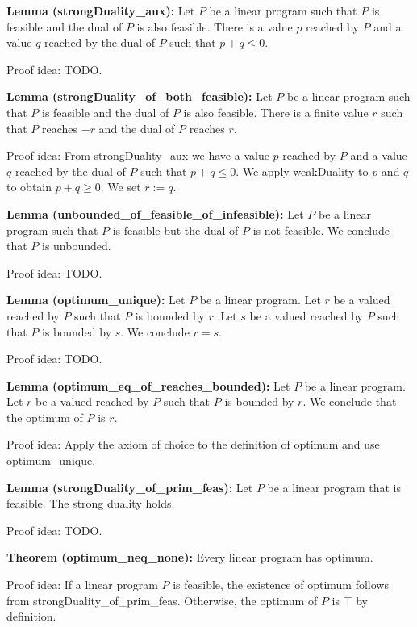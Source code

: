 \documentclass[]{article}
\renewcommand{\.}{\hskip .75pt}
\begin{document}
\medskip \noindent
\textbf{Lemma (strongDuality\_aux):}
Let $P$ be a linear program such that
$P$ is feasible and the dual of $P$ is also feasible.
There is a value $p$ reached by $P$ and
a value $q$ reached by the dual of $P$ such
that $p + q \le 0$.

\medskip \noindent
Proof idea:
TODO.

\medskip \noindent
\textbf{Lemma (strongDuality\_of\_both\_feasible):}
Let $P$ be a linear program such that
$P$ is feasible and the dual of $P$ is also feasible.
There is a finite value $r$ such that
$P$ reaches $-r$ and the dual of $P$ reaches $r$.

\medskip \noindent
Proof idea:
From strongDuality\_aux we have a value $p$ reached by $P$ and
a value $q$ reached by the dual of $P$ such that $p + q \le 0$.
We apply weakDuality to $p$ and $q$ to obtain $p + q \ge 0$.
We set $r := q$.

\medskip \noindent
\textbf{Lemma (unbounded\_of\_feasible\_of\_infeasible):}
Let $P$ be a linear program such that
$P$ is feasible but the dual of $P$ is not feasible.
We conclude that $P$ is unbounded.

\medskip \noindent
Proof idea:
TODO.

\medskip \noindent
\textbf{Lemma (optimum\_unique):}
Let $P$ be a linear program.
Let $r$ be a valued reached by $P$ such that $P$ is bounded by $r$.
Let $s$ be a valued reached by $P$ such that $P$ is bounded by $s$.
We conclude $r = s$.

\medskip \noindent
Proof idea:
TODO.

\medskip \noindent
\textbf{Lemma (optimum\_eq\_of\_reaches\_bounded):}
Let $P$ be a linear program.
Let $r$ be a valued reached by $P$ such that $P$ is bounded by $r$.
We conclude that the optimum of $P$ is $r$.

\medskip \noindent
Proof idea:
Apply the axiom of choice to the definition of optimum and use optimum\_unique.

\medskip \noindent
\textbf{Lemma (strongDuality\_of\_prim\_feas):}
Let $P$ be a linear program that is feasible.
The strong duality holds.

\medskip \noindent
Proof idea:
TODO.

\medskip \noindent
\textbf{Theorem (optimum\_neq\_none):}
Every linear program has optimum.

\medskip \noindent
Proof idea:
If a linear program $P$ is feasible, the existence of optimum
follows from strongDuality\_of\_prim\_feas.
Otherwise, the optimum of $P$ is $\top$ by definition.
\end{document}

